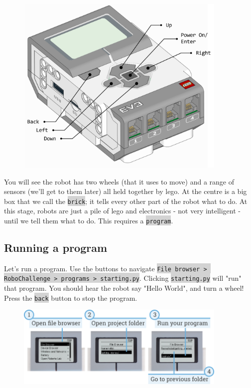 \documentclass[12pt,a4paper]{article}
\newcommand{\code}[1]{\colorbox{lightgray}{\texttt{#1}}}
\begin{document}
\begin{figure}[h]
    \centering
    \includegraphics[width=0.9\textwidth]{assets/ev3brick_labelled.png}
\end{figure}

You will see the robot has two wheels (that it uses to move) and a range of sensors (we'll get to them later) all held together by lego. At the centre is a big box that we call the \code{brick}; it tells every other part of the robot what to do. At this stage, robots are just a pile of lego and electronics - not very intelligent - until we tell them what to do. This requires a \code{program}. 

\subsection{ Running a program}
Let's run a program.
Use the buttons to navigate \code{File browser > RoboChallenge > programs > starting.py}. Clicking \code{starting.py} will "run" that program. You should hear the robot say "Hello World", and turn a wheel! Press the \code{back} button to stop the program.

\begin{figure}[h]
    \centering
    \includegraphics[width=0.9\textwidth]{assets/run_program_manual.png}
\end{figure}
\end{document}
